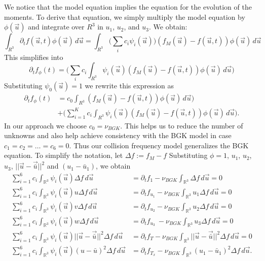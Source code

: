%
We notice that the model equation implies the equation for the evolution of the moments. To derive that equation, we simply multiply the model equation by $\phi(\vec{u})$ and integrate over $R^3$ in $u_1$, $u_2$, and $u_3$. We obtain:
%
\begin{equation*}
\int_{R^3}\partial_{t} f(\vec{u},t)\phi(\vec{u})\, d\vec{u} = 
\int_{R^3}\Big( \sum_{i} c_{i}\psi_{i}(\vec{u})\Big) (f_M(\vec{u})-f(\vec{u},t))\phi(\vec{u})\, d\vec{u}
\end{equation*}
%
This simplifies into 
%
\begin{equation*}
\partial_{t} f_{\phi}(t) = 
\Big( \sum_{i} c_{i}\int_{R^3}\psi_{i}(\vec{u})(f_M(\vec{u})-f(\vec{u},t))\phi(\vec{u})\, d\vec{u} \Big) 
\end{equation*}
%
Substituting $\psi_{0}(\vec{u}) = 1$ we rewrite this expression as
%
\begin{align*}
\partial_{t} f_{\phi}(t)& = c_{0} \int_{R^3} (f_M(\vec{u})-f(\vec{u},t))\phi(\vec{u})\, d\vec{u} ) \\
&+\Big( \sum_{i=1}^{K} c_{i}\int_{R^3}\psi_{i}(\vec{u})(f_M(\vec{u})-f(\vec{u},t))\phi(\vec{u})\, d\vec{u} ).
\end{align*}
%
In our approach we choose $c_0 = \nu_{BGK}$.  This helps us to reduce the number of unknowns and also help achieve consistency with the BGK model in case $c_{1}=c_{2}=\ldots =c_{6}=0$. Thus our collision frequency model generalizes the BGK equation. To simplify the notation, let $\Delta f := f_M - f$ Substituting $\phi=1$, $u_1$, $u_2$, $u_3$, $||\vec{u}-\vec{\bar{u}}||^2$ and $(u_1-\bar{u}_1)$, we obtain
%
\begin{align}
\sum_{i=1}^6 c_i \int_{\mathbb{R}^3} \psi_i(\vec{u}) \Delta f \, d\vec{u} &= \partial_t f_1 - \nu_{BGK} \int_{\mathbb{R}^3} \Delta f \, d\vec{u} =0 \nonumber \\
\sum_{i=1}^6 c_i \int_{\mathbb{R}^3} \psi_i(\vec{u}) u \Delta f \, d\vec{u} &= \partial_t f_{u_1} - \nu_{BGK} \int_{\mathbb{R}^3} u_1 \Delta f \, d\vec{u} = 0 \nonumber \\
\sum_{i=1}^6 c_i \int_{\mathbb{R}^3} \psi_i(\vec{u}) v \Delta f \, d\vec{u} &= \partial_t f_{u_2} - \nu_{BGK} \int_{\mathbb{R}^3} u_2 \Delta f \, d\vec{u} = 0 \nonumber \\
\sum_{i=1}^6 c_i \int_{\mathbb{R}^3} \psi_i(\vec{u}) w \Delta f \, d\vec{u} &= \partial_t f_{u_3}\ - \nu_{BGK} \int_{\mathbb{R}^3} u_3 \Delta f \, d\vec{u} = 0 \nonumber \\
\sum_{i=1}^6 c_i \int_{\mathbb{R}^3} \psi_i(\vec{u}) ||\vec{u} - \vec{\bar{u}}||^2 \Delta f \, d\vec{u} &= \partial_t f_T - \nu_{BGK} \int_{\mathbb{R}^3} ||\vec{u} - \vec{\bar{u}}||^2 \Delta f \, d\vec{u} = 0 \nonumber \\
\label{lastOne}
\sum_{i=1}^6 c_i \int_{\mathbb{R}^3} \psi_i(\vec{u}) (u - \bar{u})^2 \Delta f \, d\vec{u} &= \partial_t f_{T_x} - \nu_{BGK} \int_{\mathbb{R}^3} (u_1 - \bar{u}_1)^2 \Delta f \, d\vec{u}.
\end{align}
